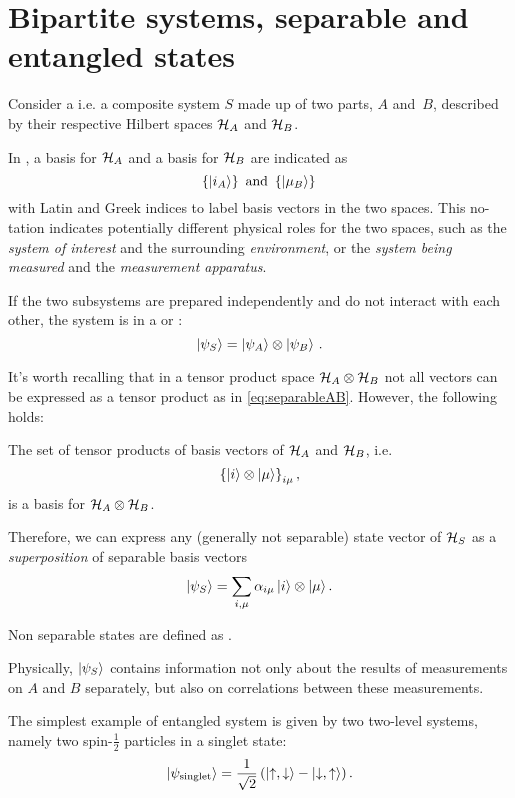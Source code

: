 \section{Bipartite systems, separable and entangled states}

Consider a 
i.e. a composite system $S$
made up of two parts, $A$ and~$B$,
described by their respective Hilbert spaces
$\mathcal{H}_A$ and $\mathcal{H}_B$.

In \cite{Haroche_Exploring},
a basis for $\mathcal{H}_A$ and a basis for $\mathcal{H}_B$
are indicated as
$$
  \left\{\ket{i_A}\right\} \text{ and } \left\{\ket{\mu_B}\right\}\,
$$
with Latin and Greek indices to label basis vectors in the two spaces.
This no-\\tation %
in\-di\-cates potentially different physical roles for the two spaces,
such as the \emph{system of interest} and the surrounding \emph{environment},
or the \emph{system being measured} and the \emph{measurement apparatus}.

If the two subsystems are prepared independently and do not interact with each other,
the system is in a  or :
\begin{equation}\label{eq:separableAB}
  \ket{\psi_S} = \ket{\psi_A}\otimes\ket{\psi_B} \,\text{.}
\end{equation}

It's worth recalling that in a tensor product space $\mathcal{H}_A\otimes\mathcal{H}_B$
not all vectors can be expressed as a tensor product as in \eqref{eq:separableAB}.
However, the following holds:

\begin{proposition}\label{TensorBase}
The set of tensor products of basis vectors of $\mathcal{H}_A$ and $\mathcal{H}_B$,
i.e. $$\left\{\ket{i} \otimes \ket{\mu}\right\}_{i\mu},$$
is a basis for $\mathcal{H}_A \otimes \mathcal{H}_B$.
\end{proposition}
Therefore, we can express any
(generally not separable) state vector of $\mathcal{H}_S$
as a \emph{superposition} of separable basis vectors
\begin{equation}\label{eq:bipartite_expansion}
  \ket{\psi_S} = \sum_{i, \mu}\alpha_{i\mu}\ket{i}\otimes\ket{\mu} \text{.}
\end{equation}

\begin{definition}
  Non separable states are defined as .  
\end{definition}

Physically,
$\ket{\psi_S}$ contains information
not only about the results of measurements on $A$ and $B$ separately,
but also on correlations between these measurements.

The simplest example of entangled system is given by two two-level systems,
namely two spin-$\frac{1}{2}$ particles in a singlet state:
\[
  \ket{\psi_{\text{singlet}}} = \frac{1}{\sqrt{2}} \left(\ket{\uparrow, \downarrow} - \ket{\downarrow, \uparrow}\right).
\]
